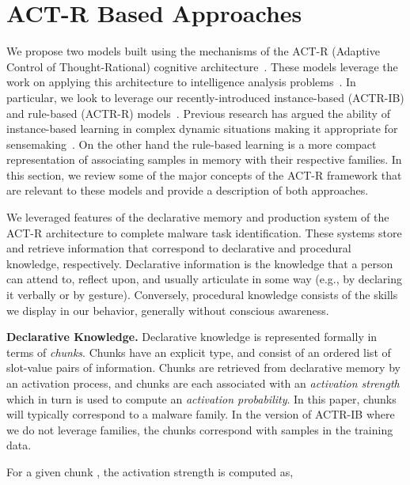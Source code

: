 \documentclass[conference]{IEEEtran}
\begin{document}
\section{ACT-R Based Approaches}
\label{apprSec}

We propose two models built using the mechanisms of the ACT-R (Adaptive Control of Thought-Rational) cognitive architecture~\cite{Anderson04anintegrated}.  These models leverage the work on applying this architecture to intelligence analysis problems~\cite{Lebiere:2013}.  In particular, we look to leverage our recently-introduced instance-based (ACTR-IB) and rule-based (ACTR-R) models~\cite{iccm:2015,brims}.  Previous research has argued the ability of instance-based learning in complex dynamic situations making it appropriate for sensemaking~\cite{Gonzalez2003591}. On the other hand the rule-based learning is a more compact representation of associating samples in memory with their respective families.  In this section, we review some of the major concepts of the ACT-R framework that are relevant to these models and provide a description of both approaches. 

We leveraged features of the declarative memory and production system of the ACT-R architecture to complete malware task identification. These systems store and retrieve information that correspond to declarative and procedural knowledge, respectively. Declarative information is the knowledge that a person can attend to, reflect upon, and usually articulate in some way (e.g., by declaring it verbally or by gesture). Conversely, procedural knowledge consists of the skills we display in our behavior, generally without conscious awareness. 

\noindent\textbf{Declarative Knowledge.}  Declarative knowledge is represented formally in terms of \textit{chunks}. Chunks have an explicit type, and consist of an ordered list of slot-value pairs of information.  Chunks are retrieved from declarative memory by an activation process, and chunks are each associated with an \textit{activation strength} which in turn is used to compute an \textit{activation probability}.  In this paper, chunks will typically correspond to a malware family.  In the version of ACTR-IB where we do not leverage families, the chunks correspond with samples in the training data. 

For a given chunk , the activation strength  is computed as,
\end{document}
